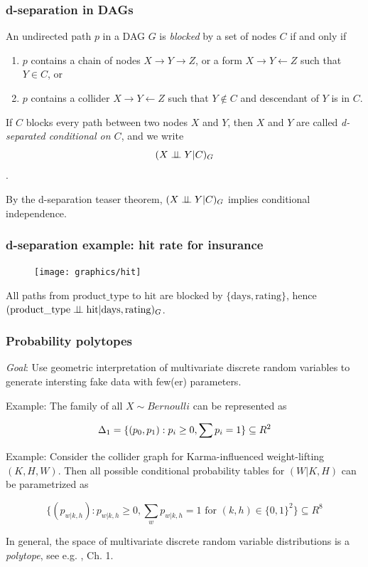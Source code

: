 \begin{frame}
\frametitle{d-separation in DAGs}
\begin{definition}
An undirected path $p$ in a DAG $G$ is \emph{blocked} by a set of nodes $C$ if and only if
\begin{enumerate}
\item $p$ contains a chain of nodes $X \to Y \to Z$, or a form $X \rightarrow Y \leftarrow Z$ such that $Y \in C$, or
\item $p$ contains a collider $X \to Y \leftarrow Z$ such that $Y \notin C$ and descendant of $Y$ is in $C$.
\end{enumerate}
\end{definition}

\begin{definition}
If $C$ blocks every path between two nodes $X$ and $Y$, then $X$ and $Y$ are called \emph{d-separated conditional on $C$}, and we write 
$$(X \perp\!\!\!\perp Y | C)_{G}$$.
\end{definition}

By the d-separation teaser theorem, $(X \perp\!\!\!\perp Y | C)_{G}$ implies conditional independence.\newline
\end{frame}


\begin{frame}
\frametitle{d-separation example: hit rate for insurance}
\begin{figure}[ht]
  \centering
  \texttt{[image: graphics/hit]}
\end{figure}

All paths from $\mathrm{product\_type}$ to $\mathrm{hit}$ are blocked by $\{\mathrm{days}, \mathrm{rating}\}$, hence $(\mathrm{product\_type} \perp\!\!\!\perp \mathrm{hit} | \mathrm{days}, \mathrm{rating})_G$.
\end{frame}


\begin{frame}
\frametitle{Probability polytopes}

\emph{Goal}: Use geometric interpretation of multivariate discrete random variables to generate intersting fake data with few(er) parameters.\newline

Example: The family of all $X \sim Bernoulli$ can be represented as

\begin{equation*}
\Delta_1 = \{(p_0, p_1): p_i \geq 0, \sum p_i = 1\} \subseteq R^2\newline
\end{equation*}

Example: Consider the collider graph for Karma-influenced weight-lifting $(K, H, W)$. Then all possible conditional probability tables for $(W | K, H)$ can be parametrized as 

\begin{equation*}
  \{(p_{w | k, h}): p_{w | k, h} \geq 0, \sum_w p_{w  | k,h} = 1 \textrm{ for } (k, h) \in \{0, 1\}^2\} \subseteq R^8
\end{equation*}

In general, the space of multivariate discrete random variable distributions is a \emph{polytope}, see e.g. \cite{drton2008lectures}, Ch. 1.
\end{frame}


